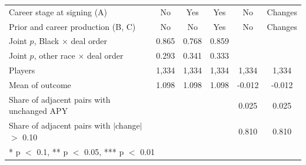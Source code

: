 \begin{table}[H]
{\begin{tabular}[t]{lccccc}
Career stage at signing (A) & No & Yes & Yes & No & Changes\\
Prior and career production (B, C) & No & No & Yes & No & Changes\\
Joint $p$, Black $\times$ deal order & 0.865 & 0.768 & 0.859 &  & \\
Joint $p$, other race $\times$ deal order & 0.293 & 0.341 & 0.333 &  & \\
Players & 1,334 & 1,334 & 1,334 & 1,334 & 1,334\\
Mean of outcome & 1.098 & 1.098 & 1.098 & -0.012 & -0.012\\
Share of adjacent pairs with unchanged APY &  &  &  & 0.025 & 0.025\\
Share of adjacent pairs with $|$change$|$ $>$ 0.10 &  &  &  & 0.810 & 0.810\\
\bottomrule
\multicolumn{6}{l}{\rule{0pt}{1em}* p $<$ 0.1, ** p $<$ 0.05, *** p $<$ 0.01}\\
\end{tabular}}
\end{table}

